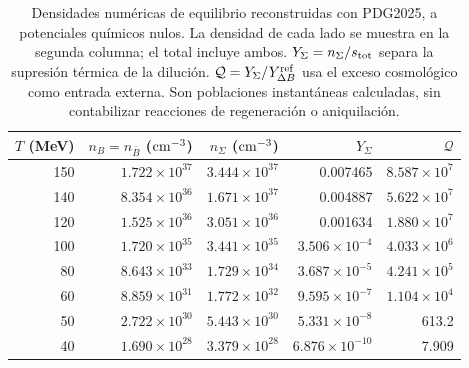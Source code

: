 \begin{table}[t]\centering\small
\caption{Densidades numéricas de equilibrio reconstruidas con PDG2025, a potenciales químicos nulos. La densidad de cada lado se muestra en la segunda columna; el total incluye ambos. $Y_\Sigma=n_\Sigma/s_{\rm tot}$ separa la supresión térmica de la dilución. $\mathcal Q=Y_\Sigma/Y_{\Delta B}^{\rm ref}$ usa el exceso cosmológico como entrada externa. Son poblaciones instantáneas calculadas, sin contabilizar reacciones de regeneración o aniquilación.}\label{tab:populations}
\setlength{\tabcolsep}{12pt}\renewcommand{\arraystretch}{1.14}
\begin{tabular}{rrrrr}\toprule
$T$ (MeV) & $n_B=n_{\bar B}$ (${\rm cm^{-3}}$) & $n_\Sigma$ (${\rm cm^{-3}}$) & $Y_\Sigma$ & $\mathcal Q$ \\ \midrule
150 & $1.722\times10^{37}$ & $3.444\times10^{37}$ & 0.007465 & $8.587\times10^{7}$ \\
140 & $8.354\times10^{36}$ & $1.671\times10^{37}$ & 0.004887 & $5.622\times10^{7}$ \\
120 & $1.525\times10^{36}$ & $3.051\times10^{36}$ & 0.001634 & $1.880\times10^{7}$ \\
100 & $1.720\times10^{35}$ & $3.441\times10^{35}$ & $3.506\times10^{-4}$ & $4.033\times10^{6}$ \\
80 & $8.643\times10^{33}$ & $1.729\times10^{34}$ & $3.687\times10^{-5}$ & $4.241\times10^{5}$ \\
60 & $8.859\times10^{31}$ & $1.772\times10^{32}$ & $9.595\times10^{-7}$ & $1.104\times10^{4}$ \\
50 & $2.722\times10^{30}$ & $5.443\times10^{30}$ & $5.331\times10^{-8}$ & 613.2 \\
40 & $1.690\times10^{28}$ & $3.379\times10^{28}$ & $6.876\times10^{-10}$ & 7.909 \\
\bottomrule\end{tabular}\end{table}
